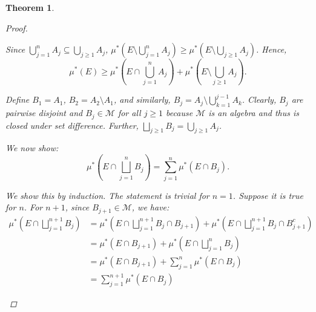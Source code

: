\documentclass{article}
\newcommand{\M}{\mathcal{M}}
\theoremstyle{spaced}
\newtheorem{theorem}{Theorem}[section]
\begin{document}
\begin{theorem}
\begin{proof}
\begin{enumerate}
\begin{enumerate}
            Since $\bigcup_{j=1}^{n} A_j \subseteq\bigcup_{j \geq 1} A_j$, $\mu^*(E \setminus \bigcup_{j=1}^n A_j) \geq \mu^*(E \setminus \bigcup_{j \geq 1} A_j)$. Hence, 
                \begin{equation}
                    \mu^*(E) \geq \mu^*\left( E \cap \bigcup_{j = 1}^n A_j \right) +  \mu^*\left( E \setminus \bigcup_{j \geq 1} A_j\right).
                \end{equation}

            Define $B_1 = A_1$, $B_2 = A_2 \setminus A_1$, and similarly, $B_j = A_j \setminus \bigcup_{k = 1} ^ {j - 1} A_k$. Clearly, $B_j$ are pairwise disjoint and $B_j \in \M$ for all $j \geq 1$ because $\M$ is an algebra and thus is closed under set difference. Further, $\bigsqcup_{j \geq 1} B_j = \bigcup_{j \geq 1} A_j$.
            
            \vspace{1em}
            We now show:
                \begin{equation}
                \mu^*\left(E \cap \bigsqcup_{j = 1}^n B_j\right) = \sum_{j = 1}^n \mu^*(E \cap B_j).    
                \end{equation}                

            We show this by induction. The statement is trivial for $n = 1$. Suppose it is true for $n$. For $n + 1$, since $B_{j + 1} \in \M$, we have:
                \begin{align*}
                    \mu^*\left(E \cap \bigsqcup_{j = 1}^{n+1} B_j\right) 
                    &= \mu^*\left(E \cap \bigsqcup_{j = 1}^{n+1} B_j \cap B_{j + 1}\right) + \mu^*\left(E \cap \bigsqcup_{j = 1}^{n+1} B_j \cap B_{j + 1}^c \right) \\
                    &= \mu^*(E \cap B_{j + 1}) + \mu^*\left( E \cap \bigsqcup_{j = 1}^{n} B_j\right) \\
                    &= \mu^*(E \cap B_{j + 1}) + \sum_{j = 1}^n \mu^*(E \cap B_j) \\
                    &= \sum_{j = 1}^{n+1} \mu^*(E \cap B_j)
                \end{align*}


\end{enumerate}
\end{enumerate}
\end{proof}
\end{theorem}
\end{document}
